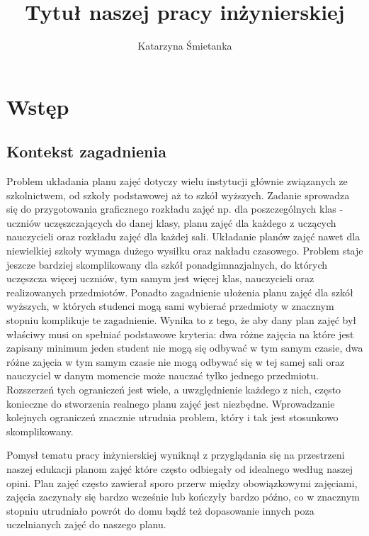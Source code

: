 \documentclass[11pt]{report}
\title{Tytuł naszej pracy inżynierskiej}
\author{Katarzyna Śmietanka}
\begin{document}
%
%

\maketitle
\tableofcontents

\chapter{Wstęp}

\section{Kontekst zagadnienia}

\par Problem układania planu zajęć dotyczy wielu instytucji głównie związanych ze szkolnictwem, od szkoły podstawowej aż to szkół wyższych. Zadanie sprowadza się do przygotowania graficznego rozkładu zajęć np. dla poszczególnych klas - uczniów uczęszczających do danej klasy, planu zajęć dla każdego z uczących nauczycieli oraz rozkładu zajęć dla każdej sali. Układanie planów zajęć nawet dla niewielkiej szkoły wymaga dużego wysiłku oraz nakładu czasowego. Problem staje jeszcze bardziej skomplikowany dla szkół ponadgimnazjalnych, do których uczęszcza więcej uczniów, tym samym jest więcej klas, nauczycieli oraz realizowanych przedmiotów. Ponadto zagadnienie ułożenia planu zajęć dla szkół wyższych, w których studenci mogą sami wybierać przedmioty w znacznym stopniu komplikuje te zagadnienie. Wynika to z tego, że aby dany plan zajęć był właściwy musi on spełniać podstawowe kryteria: dwa różne zajęcia na które jest zapisany minimum jeden student nie mogą się odbywać w tym samym czasie, dwa różne zajęcia w tym samym czasie nie mogą odbywać się w tej samej sali oraz nauczyciel w danym momencie może nauczać tylko jednego przedmiotu. Rozszerzeń tych ograniczeń jest wiele, a uwzględnienie każdego z nich, często konieczne do stworzenia realnego planu zajęć jest niezbędne. Wprowadzanie kolejnych ograniczeń znacznie utrudnia problem, który i tak jest stosunkowo skomplikowany.
\par Pomysł tematu pracy inżynierskiej wyniknął z przyglądania się na przestrzeni naszej edukacji planom zajęć które często odbiegały od idealnego według naszej opini. Plan zajęć często zawierał sporo przerw między obowiązkowymi zajęciami, zajęcia zaczynały się bardzo wcześnie lub kończyły bardzo późno, co w znacznym stopniu utrudniało powrót do domu bądź też dopasowanie innych poza uczelnianych zajęć do naszego planu.
\end{document}
